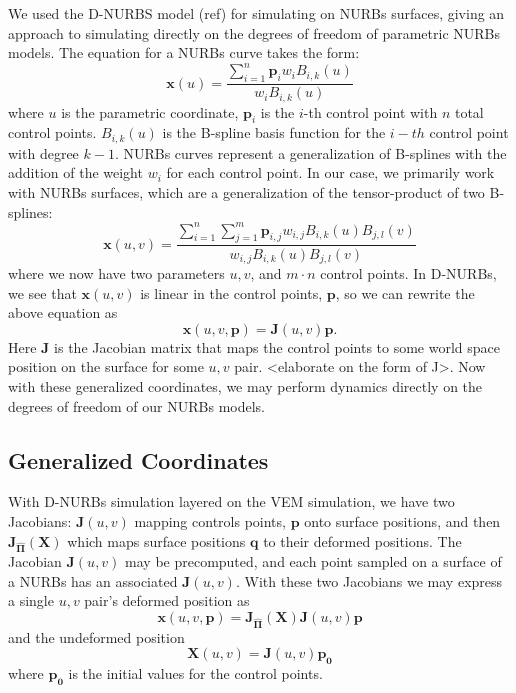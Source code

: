 \documentclass[sigconf]{acmart}
\begin{document}
We used the D-NURBS model (ref) for simulating on NURBs surfaces, giving an approach to simulating directly on the degrees of freedom of parametric NURBs models. The equation for a NURBs curve takes the form:
\begin{equation}
    \mathbf{x}(u) = \frac{\sum_{i=1}^{n} \mathbf{p}_i w_i B_{i,k}(u)}{ w_i B_{i,k}(u)}
\end{equation}
where $u$ is the parametric coordinate, $\mathbf{p}_i$ is the $i$-th control point with $n$ total control points. $B_{i,k}(u)$ is the B-spline basis function for the $i-th$ control point with degree $k-1$. NURBs curves represent a generalization of B-splines with the addition of the weight $w_i$ for each control point. In our case, we primarily work with NURBs surfaces, which are a generalization of the tensor-product of two B-splines:
\begin{equation}
    \mathbf{x}(u,v) = \frac{\sum_{i=1}^{n}\sum_{j=1}^{m}  \mathbf{p}_{i,j} w_{i,j} B_{i,k}(u)B_{j,l}(v)}{ w_{i,j} B_{i,k}(u)B_{j,l}(v)}
\end{equation}
where we now have two parameters $u,v$, and $m\cdot n$ control points. In D-NURBs, we see that $\mathbf{x}(u,v)$ is linear in the control points, $\mathbf{p}$, so we can rewrite the above equation as
\begin{equation}
    \mathbf{x}(u,v,\mathbf{p}) = \mathbf{J}(u,v)\mathbf{p}.
\end{equation}
Here $\mathbf{J}$ is the Jacobian matrix that maps the control points to some world space position on the surface for some $u,v$ pair. <elaborate on the form of J>. Now with these generalized coordinates, we may perform dynamics directly on the degrees of freedom of our NURBs models. 

\subsection{Generalized Coordinates}
With D-NURBs simulation layered on the VEM simulation, we have two Jacobians: $\mathbf{J}(u,v)$ mapping controls points, $\mathbf{p}$ onto surface positions, and then $\mathbf{J_{\hat{\Pi}}(X)}$ which maps surface positions $\mathbf{q}$ to their deformed positions. The Jacobian $\mathbf{J}(u,v)$  may be precomputed, and each point sampled on a surface of a NURBs has an associated $\mathbf{J}(u,v)$. With these two Jacobians we may express a single $u,v$ pair's deformed position as
\begin{equation}
    \mathbf{x}(u,v,\mathbf{p}) = \mathbf{J_{\hat{\Pi}}(X)}\mathbf{J}(u,v)\mathbf{p}
\end{equation}
and the undeformed position
\begin{equation}
    \mathbf{X}(u,v) = \mathbf{J}(u,v)\mathbf{p_0}
\end{equation}
where $\mathbf{p_0}$ is the initial values for the control points.
\end{document}
